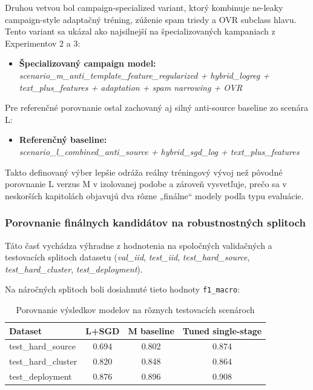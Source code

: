 \documentclass[conference]{IEEEtran}
\begin{document}
Druhou vetvou bol campaign-specialized variant, ktorý kombinuje ne-leaky campaign-style adaptačný tréning, zúženie spam triedy a OVR subclass hlavu. Tento variant sa ukázal ako najsilnejší na špecializovaných kampaniach z Experimentov 2 a 3:
\begin{itemize}
    \item \textbf{Špecializovaný campaign model:} \\
    \textit{scenario\_m\_anti\_template\_feature\_regularized + hybrid\_logreg + text\_plus\_features + adaptation + spam narrowing + OVR}
\end{itemize}

Pre referenčné porovnanie ostal zachovaný aj silný anti-source baseline zo scenára L:
\begin{itemize}
    \item \textbf{Referenčný baseline:} \\
    \textit{scenario\_l\_combined\_anti\_source + hybrid\_sgd\_log + text\_plus\_features}
\end{itemize}

Takto definovaný výber lepšie odráža reálny tréningový vývoj než pôvodné porovnanie L verzus M v izolovanej podobe a zároveň vysvetľuje, prečo sa v neskorších kapitolách objavujú dva rôzne „finálne“ modely podľa typu evaluácie.

\subsubsection{Porovnanie finálnych kandidátov na robustnostných splitoch}

Táto časť vychádza výhradne z hodnotenia na spoločných validačných a testovacích splitoch datasetu
(\textit{val\_iid}, \textit{test\_iid}, \textit{test\_hard\_source}, \textit{test\_hard\_cluster}, \textit{test\_deployment}).


Na náročných splitoch boli dosiahnuté tieto hodnoty \texttt{f1\_macro}:

\begin{table}[H]
\centering
\caption{Porovnanie výsledkov modelov na rôznych testovacích scenároch}
\label{tab:model_results}
\footnotesize
\setlength{\tabcolsep}{5pt}
\renewcommand{\arraystretch}{1.1}
\begin{tabular}{lccc}
\toprule
\textbf{Dataset} & \textbf{L+SGD} & \textbf{M baseline} & \textbf{Tuned single-stage} \\
\midrule
test\_hard\_source   & 0.694 & 0.802 & 0.874 \\
test\_hard\_cluster  & 0.820 & 0.848 & 0.864 \\
test\_deployment     & 0.876 & 0.896 & 0.908 \\
\bottomrule
\end{tabular}

\end{table}
\end{document}
